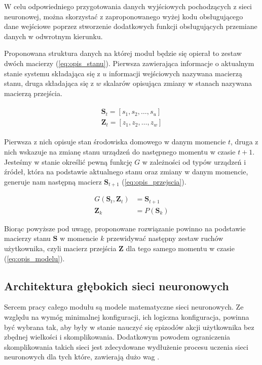 W celu odpowiedniego przygotowania danych wyjściowych pochodzących z sieci neuronowej, można skorzystać z zaproponowanego wyżej kodu obsługującego dane wejściowe poprzez stworzenie dodatkowych funkcji obsługujących przemiane danych w odwrotnym kierunku. %

Proponowana struktura danych na której moduł będzie się opierał to zestaw dwóch macierzy (\ref{eq:opis_stanu}). Pierwsza zawierająca informacje o aktualnym stanie systemu składająca się z $u$ informacji wejściowych nazywana macierzą stanu, druga składająca się z $w$ skalarów opisująca zmiany w stanach nazywana macierzą przejścia. 

\begin{align}
    \begin{split}
        \mathbf{S}_t = \left[s_1, s_2, \dots, s_u\right] \\
        \mathbf{Z}_t = \left[z_1, z_2, \dots, z_w\right]
    \end{split}
    \label{eq:opis_stanu}
\end{align}


Pierwsza z nich opisuje stan środowiska domowego w danym momencie $t$, druga z nich wskazuje na zmianę stanu urządzeń do następnego momentu w czasie $t+1$. Jesteśmy w stanie określić pewną funkcję $G$ w zależności od typów urządzeń i źródeł, która na podstawie aktualnego stanu oraz zmiany w danym momencie, generuje nam następną macierz $\mathbf{S}_{t+1}$ (\ref{eq:opis_przejscia}).

\begin{align}
    G\left(\mathbf{S}_t, \mathbf{Z}_t\right) &= \mathbf{S}_{t+1} \label{eq:opis_przejscia} \\
    \mathbf{Z}_k &= P(\mathbf{S}_k) \label{eq:opis_modelu}
\end{align}

Biorąc powyższe pod uwagę, proponowane rozwiązanie powinno na podstawie macierzy stanu $\mathbf{S}$ w momencie $k$ przewidywać następny zestaw ruchów użytkownika, czyli macierz przejścia $\mathbf{Z}$ dla tego samego momentu w czasie (\ref{eq:opis_modelu}).

\subsection{Architektura głębokich sieci neuronowych} \label{subsec:nn}
Sercem pracy całego modułu są modele matematyczne sieci neuronowych. Ze względu na wymóg minimalnej konfiguracji, ich logiczna konfiguracja, powinna być wybrana tak, aby były w stanie nauczyć się epizodów akcji użytkownika bez zbędnej wielkości i skomplikowania. Dodatkowym powodem ograniczenia skomplikowania takich sieci jest zdecydowane wydłużenie procesu uczenia sieci neuronowych dla tych które, zawierają dużo wag \cite{time_complexity_nn}.


